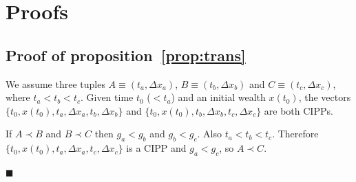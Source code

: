 \documentclass[11pt]{article}
\newcommand*{\qed}{\hfill\ensuremath{\blacksquare}}%
\newcommand{\preflong}[1]{proposition~\ref{prop:#1}}
\newcommand{\Dx}{\Delta x}
\numberwithin{equation}{section}
\begin{document}

\newpage




\clearpage

\appendix


\section{Proofs}
\label{app:appA}

\subsection{Proof of \preflong{trans}}

We assume three tuples $A\equiv\left(t_a,\Dx_a\right)$, $B\equiv\left(t_b,\Dx_b\right)$ and $C\equiv\left(t_c,\Dx_c\right)$, where $t_a < t_b < t_c$. Given time $t_0$ ($< t_a$) and an initial wealth $x\left(t_0\right)$, the vectors $\{t_0,x\left(t_0\right),t_a,\Dx_a,t_b,\Dx_b\}$ and $\{t_0,x\left(t_0\right),t_b,\Dx_b,t_c,\Dx_c\}$ are both CIPPs.

If $A \prec B$ and $B \prec C$ then $g_a < g_b$ and $g_b < g_c$. Also $t_a < t_b < t_c$. Therefore $\{t_0,x\left(t_0\right),t_a,\Dx_a,t_c,\Dx_c\}$ is a CIPP and $g_a < g_c$, so $A \prec C$.

\qed
\end{document}

